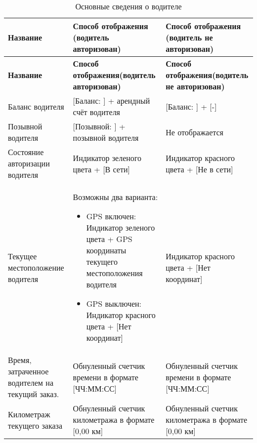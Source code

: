         \setlength{\extrarowheight}{2mm}
          \begin{longtable}{|p{5cm}|p{5cm}|p{5cm}|}
            
            \caption {Основные сведения о водителе} \label{driver_app_taximeter_tab_start_interface_table_driver_info} \\

              \hline  \textbf{Название}&\textbf{Способ отображения (водитель авторизован)}&\textbf{Способ отображения (водитель не авторизован)} \\ [2mm]
              \endfirsthead
              \hline  \textbf{Название}&\textbf{Способ отображения(водитель авторизован)}&\textbf{Способ отображения(водитель не авторизован)} \\ [2mm]
              \endhead

              \hline   Баланс водителя & [Баланс: ] + арендный счёт водителя & [Баланс: ] + [-] \\ [2mm]

              \hline   Позывной водителя & [Позывной: ] + позывной водителя & Не отображается \\ [2mm]

              \hline   Состояние авторизации водителя & Индикатор зеленого цвета + [В сети] & Индикатор красного цвета + [Не в сети] \\ [2mm] %

              \hline   Текущее местоположение водителя & Возможны два варианта: \begin{itemize} \item GPS включен: Индикатор зеленого цвета + GPS координаты текущего местоположения водителя \item GPS выключен: Индикатор красного цвета + [Нет координат] \end{itemize} & Индикатор красного цвета + [Нет координат] \\ [2mm]
              
              \hline   Время, затраченное водителем на текущий заказ. & Обнуленный счетчик времени в формате [ЧЧ:ММ:СС] & Обнуленный счетчик времени в формате [ЧЧ:ММ:СС] \\ [2mm]
              
              \hline   Километраж текущего заказа & Обнуленный счетчик километража в формате [0,00 км] & Обнуленный счетчик километража в формате [0,00 км] \\ [2mm]
              
              \hline

          \end{longtable}

